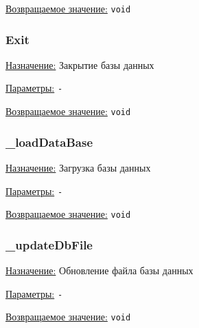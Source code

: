 \underline{Возвращаемое значение:} \verb|void|


\subsubsection*{Exit}

\underline{Назначение:} Закрытие базы данных

\underline{Параметры:} \verb|-|

\underline{Возвращаемое значение:} \verb|void|


\subsubsection*{\_loadDataBase}

\underline{Назначение:} Загрузка базы данных

\underline{Параметры:} \verb|-|

\underline{Возвращаемое значение:} \verb|void|


\subsubsection*{\_updateDbFile}

\underline{Назначение:} Обновление файла базы данных

\underline{Параметры:} \verb|-|

\underline{Возвращаемое значение:} \verb|void|
